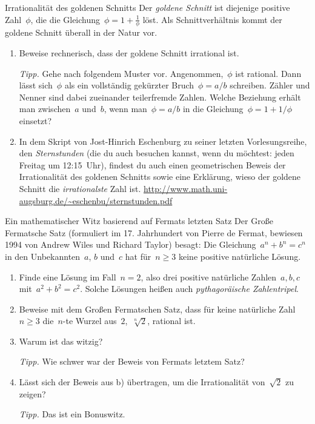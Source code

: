 \documentclass[twoside]{../zirkelblatt1415}
\theoremstyle{definition}
\theoremstyle{plain}
\theoremstyle{remark}
\begin{document}
\begin{aufgabe}{Irrationalität des goldenen Schnitts}
Der \emph{goldene Schnitt} ist diejenige positive Zahl~$\phi$, die die
Gleichung~$\phi = 1 + \frac{1}{\phi}$ löst. Als Schnittverhältnis kommt der goldene
Schnitt überall in der Natur vor.

\begin{enumerate}
\item Beweise rechnerisch, dass der goldene Schnitt irrational ist.

\emph{Tipp.} Gehe nach folgendem Muster vor. Angenommen,~$\phi$ ist rational.
Dann lässt sich~$\phi$ als ein vollständig gekürzter Bruch~$\phi = a/b$
schreiben. Zähler und Nenner sind dabei zueinander teilerfremde Zahlen. Welche
Beziehung erhält man zwischen~$a$ und~$b$, wenn man~$\phi = a/b$ in die
Gleichung~$\phi = 1 + 1/\phi$ einsetzt?

\item In dem Skript von Jost-Hinrich Eschenburg zu seiner letzten
Vorlesungsreihe, den \emph{Sternstunden} (die du auch besuchen kannst, wenn du
möchtest: jeden Freitag um 12:15~Uhr), findest du auch einen geometrischen
Beweis der Irrationalität des goldenen Schnitts sowie eine Erklärung, wieso der
goldene Schnitt die \emph{irrationalste} Zahl ist.
\url{http://www.math.uni-augsburg.de/~eschenbu/sternstunden.pdf}
\end{enumerate}\fixlistspacing
\end{aufgabe}

\begin{aufgabe}{Ein mathematischer Witz basierend auf Fermats letzten Satz}
Der Große Fermatsche Satz (formuliert im 17. Jahrhundert von Pierre de Fermat,
bewiesen 1994 von Andrew Wiles und Richard Taylor) besagt: Die Gleichung~$a^n +
b^n = c^n$ in den Unbekannten~$a$, $b$ und~$c$ hat für~$n \geq 3$ keine
positive natürliche Lösung.
\begin{enumerate}
\item Finde eine Lösung im Fall~$n = 2$, also drei positive natürliche
Zahlen~$a,b,c$ mit~$a^2 + b^2 = c^2$. Solche Lösungen heißen auch
\emph{pythagoräische Zahlentripel}.
\item Beweise mit dem Großen Fermatschen Satz, dass für keine natürliche
Zahl~$n \geq 3$ die~$n$-te Wurzel aus~$2$,~$\sqrt[n]{2}$, rational
ist.
\item Warum ist das witzig?

\emph{Tipp.} Wie schwer war der Beweis von Fermats letztem Satz?

\item Lässt sich der Beweis aus b) übertragen, um die Irrationalität
von~$\sqrt{2}$ zu zeigen?

\emph{Tipp.} Das ist ein Bonuswitz.
\end{enumerate}\fixlistspacing
\end{aufgabe}
\end{document}
